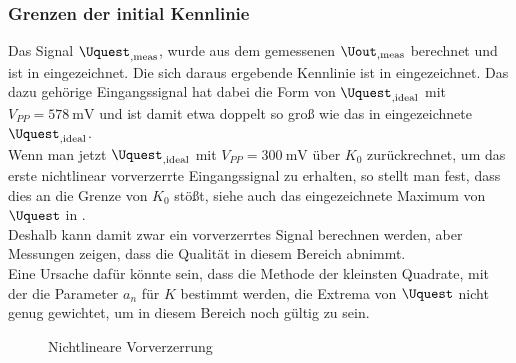\documentclass[../Report.tex]{subfiles}
\begin{document}
\subsubsection*{Grenzen der initial Kennlinie}
\label{subsubsec:opt.adjusta.problem}
Das Signal $\Uquest_{,\mathrm{meas}}$, wurde aus dem gemessenen $\Uout_{,\mathrm{meas}}$ berechnet und ist in  eingezeichnet. Die sich daraus ergebende Kennlinie ist in  eingezeichnet. Das dazu gehörige Eingangssignal hat dabei die Form von $\Uquest_{, \mathrm{ideal}}$ mit $V_{PP} = \SI{578}{\mV}$ und ist damit etwa doppelt so groß wie das in  eingezeichnete $\Uquest_{, \mathrm{ideal}}$.\\
Wenn man jetzt $\Uquest_{, \mathrm{ideal}}$ mit $V_{PP} = \SI{300}{\mV}$ über $K_0$ zurückrechnet, um das erste nichtlinear vorverzerrte Eingangssignal zu erhalten, so stellt man fest, dass dies an die Grenze von $K_0$ stößt, siehe auch das eingezeichnete Maximum von $\Uquest$ in . \\
Deshalb kann damit zwar ein vorverzerrtes Signal berechnen werden, aber Messungen zeigen, dass die Qualität in diesem Bereich abnimmt. \\
Eine Ursache dafür könnte sein, dass die Methode der kleinsten Quadrate, mit der die Parameter $a_n$ für $K$ bestimmt werden, die Extrema von $\Uquest$ nicht genug gewichtet, um in diesem Bereich noch gültig zu sein.
\begin{figure}[H]
\begin{subfigure}{0.5 \textwidth}
	\setlength\figureheight{7.5cm}
	\setlength\figurewidth{7.5cm}
    	
	\label{fig:K0}
\end{subfigure}
\begin{subfigure}{0.5 \textwidth}
	\setlength\figureheight{7.5cm}
	\setlength\figurewidth{7.5cm}
    
	\label{fig:UinUquest}
\end{subfigure}
\caption{Nichtlineare Vorverzerrung}
\label{fig:Amplitudenproblem}
\end{figure}
\end{document}
